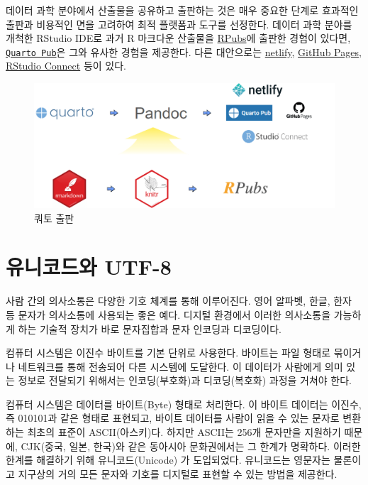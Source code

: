 \documentclass[
  letterpaper,
]{book}
\begin{document}
데이터 과학 분야에서 산출물을 공유하고 출판하는 것은 매우 중요한 단계로
효과적인 출판과 비용적인 면을 고려하여 최적 플랫폼과 도구를 선정한다.
데이터 과학 분야를 개척한 RStudio IDE로 과거 R 마크다운 산출물을
\href{https://rpubs.com/}{RPubs}에 출판한 경험이 있다면,
\href{https://quartopub.com/}{\texttt{Quarto\ Pub}}은 그와 유사한 경험을
제공한다. 다른 대안으로는 \href{https://netlify.com/}{netlify},
\href{https://github.com/}{GitHub Pages},
\href{https://www.rstudio.com/products/connect/}{RStudio Connect} 등이
있다.

\begin{figure}

{\centering \includegraphics{images/quarto-publishing.png}

}

\caption{쿼토 출판}

\end{figure}

\hypertarget{uxc720uxb2c8uxcf54uxb4dcuxc640-utf-8}{%
\chapter{유니코드와 UTF-8}\label{uxc720uxb2c8uxcf54uxb4dcuxc640-utf-8}}

사람 간의 의사소통은 다양한 기호 체계를 통해 이루어진다. 영어 알파벳,
한글, 한자 등 문자가 의사소통에 사용되는 좋은 예다. 디지털 환경에서
이러한 의사소통을 가능하게 하는 기술적 장치가 바로 문자집합과 문자
인코딩과 디코딩이다.

컴퓨터 시스템은 이진수 바이트를 기본 단위로 사용한다. 바이트는 파일
형태로 묶이거나 네트워크를 통해 전송되어 다른 시스템에 도달한다. 이
데이터가 사람에게 의미 있는 정보로 전달되기 위해서는 인코딩(부호화)과
디코딩(복호화) 과정을 거쳐야 한다.

컴퓨터 시스템은 데이터를 바이트(Byte) 형태로 처리한다. 이 바이트
데이터는 이진수, 즉 010101과 같은 형태로 표현되고, 바이트 데이터를
사람이 읽을 수 있는 문자로 변환하는 최초의 표준이 ASCII(아스키)다.
하지만 ASCII는 256개 문자만을 지원하기 때문에, CJK(중국, 일본, 한국)와
같은 동아시아 문화권에서는 그 한계가 명확하다. 이러한 한계를 해결하기
위해 유니코드(Unicode) 가 도입되었다. 유니코드는 영문자는 물론이고
지구상의 거의 모든 문자와 기호를 디지털로 표현할 수 있는 방법을
제공한다.
\end{document}
